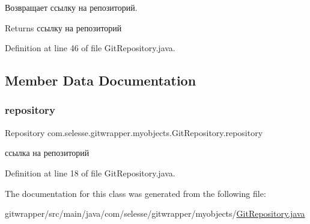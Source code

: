 Возвращает ссылку на репозиторий.

\begin{DoxyReturn}{Returns}
ссылку на репозиторий 
\end{DoxyReturn}


Definition at line 46 of file Git\+Repository.\+java.



\subsection{Member Data Documentation}
\mbox{\label{classcom_1_1selesse_1_1gitwrapper_1_1myobjects_1_1_git_repository_aa6470baa26bd93c0c0e538c938ef39c0}} 
\subsubsection{\texorpdfstring{repository}{repository}}
{\footnotesize\ttfamily Repository com.\+selesse.\+gitwrapper.\+myobjects.\+Git\+Repository.\+repository\hspace{0.3cm}{\ttfamily [private]}}



ссылка на репозиторий 



Definition at line 18 of file Git\+Repository.\+java.



The documentation for this class was generated from the following file\+:\begin{DoxyCompactItemize}
\item 
gitwrapper/src/main/java/com/selesse/gitwrapper/myobjects/\hyperlink{_git_repository_8java}{Git\+Repository.\+java}\end{DoxyCompactItemize}
